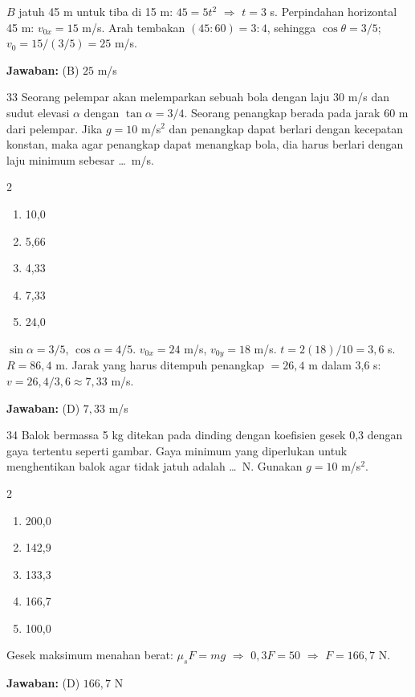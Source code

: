 \documentclass[11pt]{article}
\newenvironment{pilB}{%
  \par\smallskip\begin{multicols}{2}
  \begin{enumerate}[label=(\Alph*),leftmargin=*,itemsep=1pt,topsep=3pt]}%
  {\end{enumerate}\end{multicols}}
\newcommand{\jawaban}[1]{%
  \noindent\colorbox{gold!30}{\parbox{\dimexpr\linewidth-2\fboxsep\relax}{%
    \textbf{Jawaban:} #1}}\par\smallskip}
\begin{document}
\begin{pembox}
$B$ jatuh 45 m untuk tiba di 15 m: $45=5t^2$ $\Rightarrow$ $t=3$ s. Perpindahan horizontal 45 m: $v_{0x}=15$ m/s. Arah tembakan $(45:60)=3:4$, sehingga $\cos\theta=3/5$; $v_0=15/(3/5)=25$ m/s.
\jawaban{(B) $25$ m/s}
\end{pembox}

\begin{soal}{33}
Seorang pelempar akan melemparkan sebuah bola dengan laju 30 m/s dan
sudut elevasi $\alpha$ dengan $\tan\alpha=3/4$. Seorang penangkap
berada pada jarak 60 m dari pelempar. Jika $g=10$ m/s$^2$ dan penangkap
dapat berlari dengan kecepatan konstan, maka agar penangkap dapat
menangkap bola, dia harus berlari dengan laju minimum sebesar \ldots\ m/s.
\begin{pilB}
  \item 10,0 \item 5,66 \item 4,33 \item 7,33 \item 24,0
\end{pilB}
\end{soal}

\begin{pembox}
$\sin\alpha=3/5$, $\cos\alpha=4/5$. $v_{0x}=24$ m/s, $v_{0y}=18$ m/s. $t=2(18)/10=3{,}6$ s. $R=86{,}4$ m. Jarak yang harus ditempuh penangkap $=26{,}4$ m dalam 3,6 s: $v=26{,}4/3{,}6\approx7{,}33$ m/s.
\jawaban{(D) $7{,}33$ m/s}
\end{pembox}

\begin{soal}{34}
Balok bermassa 5 kg ditekan pada dinding dengan koefisien gesek 0,3
dengan gaya tertentu seperti gambar. Gaya minimum yang diperlukan untuk
menghentikan balok agar tidak jatuh adalah \ldots\ N.
Gunakan $g=10$ m/s$^2$.
\begin{pilB}
  \item 200,0 \item 142,9 \item 133,3 \item 166,7 \item 100,0
\end{pilB}
\end{soal}

\begin{pembox}
Gesek maksimum menahan berat: $\mu_s F=mg$ $\Rightarrow$ $0{,}3F=50$ $\Rightarrow$ $F=166{,}7$ N.
\jawaban{(D) $166{,}7$ N}
\end{pembox}
\end{document}
